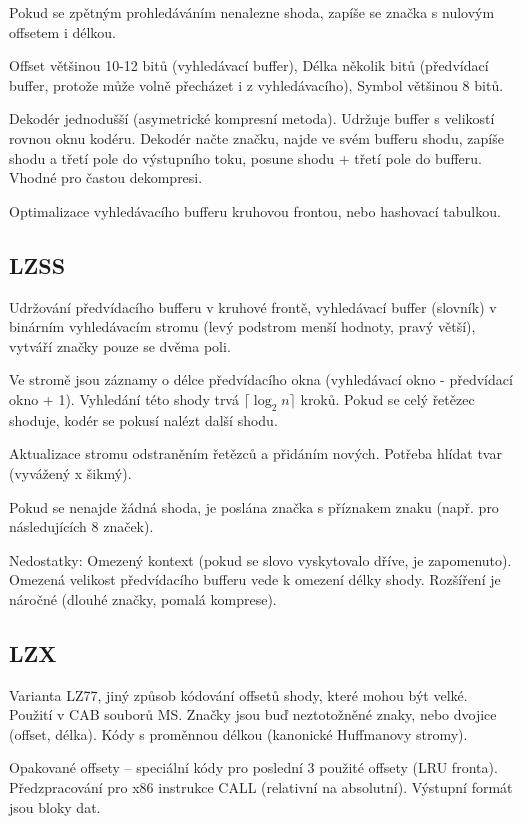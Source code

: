 \documentclass[a4paper, 11pt]{report}
\begin{document}
Pokud se zpětným prohledáváním nenalezne shoda, zapíše se značka s nulovým offsetem i délkou.

Offset většinou 10-12 bitů (vyhledávací buffer), Délka několik bitů (předvídací buffer, protože může volně přecházet i z vyhledávacího), Symbol většinou 8 bitů. 

Dekodér jednodušší (asymetrické kompresní metoda). Udržuje buffer s velikostí rovnou oknu kodéru. Dekodér načte značku, najde ve svém bufferu shodu, zapíše shodu a třetí pole do výstupního toku, posune shodu + třetí pole do bufferu. Vhodné pro častou dekompresi.

Optimalizace vyhledávacího bufferu kruhovou frontou, nebo hashovací tabulkou.

\subsection{LZSS}
Udržování předvídacího bufferu v kruhové frontě, vyhledávací buffer (slovník) v binárním vyhledávacím stromu (levý podstrom menší hodnoty, pravý větší), vytváří značky pouze se dvěma poli.

Ve stromě jsou záznamy o délce předvídacího okna (vyhledávací okno - předvídací okno + 1). Vyhledání této shody trvá $\lceil \log_2 n \rceil$ kroků. Pokud se celý řetězec shoduje, kodér se pokusí nalézt další shodu.

Aktualizace stromu odstraněním řetězců  a přidáním nových. Potřeba hlídat tvar (vyvážený x šikmý).

Pokud se nenajde žádná shoda, je poslána značka s příznakem znaku (např. pro následujících 8 značek).

Nedostatky: Omezený kontext (pokud se slovo vyskytovalo dříve, je zapomenuto). Omezená velikost předvídacího bufferu vede k omezení délky shody. Rozšíření je náročné (dlouhé značky, pomalá komprese).

\subsection{LZX}
Varianta LZ77, jiný způsob kódování offsetů shody, které mohou být velké. Použití v CAB souborů MS. Značky jsou buď neztotožněné znaky, nebo dvojice (offset, délka). Kódy s proměnnou délkou (kanonické Huffmanovy stromy).

Opakované offsety -- speciální kódy pro poslední 3 použité offsety (LRU fronta). Předzpracování pro x86 instrukce CALL (relativní na absolutní). Výstupní formát jsou bloky dat.
\end{document}
